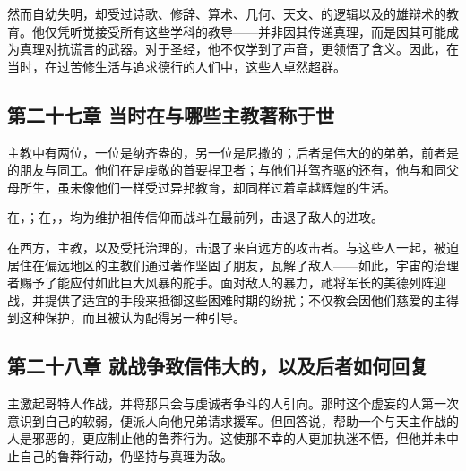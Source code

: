 然而自幼失明，却受过诗歌、修辞、算术、几何、天文、的逻辑以及的雄辩术的教育。他仅凭听觉接受所有这些学科的教导——并非因其传递真理，而是因其可能成为真理对抗谎言的武器。对于圣经，他不仅学到了声音，更领悟了含义。因此，在当时，在过苦修生活与追求德行的人们中，这些人卓然超群。\par


\subsection{第二十七章  当时在与哪些主教著称于世}

主教中有两位，一位是纳齐盎的，另一位是尼撒的；后者是伟大的的弟弟，前者是的朋友与同工。他们在是虔敬的首要捍卫者；与他们并驾齐驱的还有，他与和同父母所生，虽未像他们一样受过异邦教育，却同样过着卓越辉煌的生活。\par

在，；在，，均为维护祖传信仰而战斗在最前列，击退了敌人的进攻。\par

在西方，主教，以及受托治理的，击退了来自远方的攻击者。与这些人一起，被迫居住在偏远地区的主教们通过著作坚固了朋友，瓦解了敌人——如此，宇宙的治理者赐予了能应付如此巨大风暴的舵手。面对敌人的暴力，祂将军长的美德列阵迎战，并提供了适宜的手段来抵御这些困难时期的纷扰；不仅教会因他们慈爱的主得到这种保护，而且被认为配得另一种引导。\par


\subsection{第二十八章  就战争致信伟大的，以及后者如何回复}

主激起哥特人作战，并将那只会与虔诚者争斗的人引向。那时这个虚妄的人第一次意识到自己的软弱，便派人向他兄弟请求援军。但回答说，帮助一个与天主作战的人是邪恶的，更应制止他的鲁莽行为。这使那不幸的人更加执迷不悟，但他并未中止自己的鲁莽行动，仍坚持与真理为敌。\par

